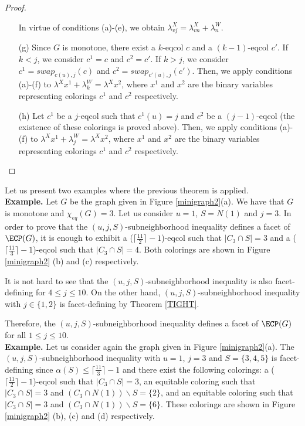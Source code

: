 \begin{proof}
\begin{enumerate}
In virtue of conditions (a)-(e), we obtain $\lambda^X_{vj} = \lambda^X_{vn} + \lambda^W_n$.
\item[(g)] Since $G$ is monotone, there exist a $k$-eqcol $c$ and a $(k-1)$-eqcol $c'$.
If $k < j$, we consider $c^1 = c$ and $c^2 = c'$. If $k > j$, we consider
$c^1 = swap_{c(u),j}(c)$ and $c^2 = swap_{c'(u),j}(c')$. Then, we apply conditions (a)-(f)
to $\lambda^X x^1 + \lambda^W_k = \lambda^X x^2$, where $x^1$ and $x^2$ are the binary variables representing
colorings $c^1$ and $c^2$ respectively.
\item[(h)] Let $c^1$ be a $j$-eqcol such that $c^1(u) = j$ and $c^2$ be a $(j-1)$-eqcol (the existence of these
colorings is proved above). Then, we apply conditions (a)-(f) to $\lambda^X x^1 + \lambda^W_j = \lambda^X x^2$,
where $x^1$ and $x^2$ are the binary variables representing colorings $c^1$ and $c^2$ respectively.
\end{enumerate}
\end{proof}

Let us present two examples where the previous theorem is applied.\\

\noindent \textbf{Example.} Let $G$ be the graph given in Figure \ref{minigraph2}(a). We have that $G$ is
monotone and $\chi_{eq}(G) = 3$. Let us consider $u = 1$, $S = N(1)$ and $j = 3$. In order to prove that the $(u,j,S)$-subneighborhood inequality
defines a facet of $\ECP(G)$, it is enough to exhibit a ($\lceil \frac{11}{2} \rceil - 1$)-eqcol
such that $|C_3 \cap S| = 3$ and a ($\lceil \frac{11}{3} \rceil - 1$)-eqcol such that $|C_3 \cap S| = 4$.
Both colorings are shown in Figure \ref{minigraph2} (b) and (c) respectively.

It is not hard to see that the $(u,j,S)$-subneighborhood inequality is also facet-defining for
$4 \leq j \leq 10$.
On the other hand, $(u,j,S)$-subneighborhood inequality with $j \in \{ 1,2 \}$
is facet-defining by Theorem \ref{TIGHT}.

Therefore, the $(u,j,S)$-subneighborhood inequality defines a facet of $\ECP(G)$ for all $1 \leq j \leq 10$.\\

\noindent \textbf{Example.} Let us consider again the graph given in Figure \ref{minigraph2}(a). The $(u,j,S)$-subneighborhood inequality with $u = 1$, $j = 3$ and $S = \{3,4,5\}$
is facet-defining since $\alpha(S) \leq \lceil \frac{11}{3} \rceil - 1$ and there exist the following colorings:
a ($\lceil \frac{11}{2} \rceil - 1$)-eqcol such that
$|C_3 \cap S| = 3$, an equitable coloring such that $|C_3 \cap S| = 3$ and $(C_3 \cap N(1)) \backslash S = \{ 2 \}$, and
an equitable coloring such that $|C_3 \cap S| = 3$ and $(C_3 \cap N(1)) \backslash S = \{ 6 \}$.
These colorings are shown in Figure \ref{minigraph2} (b), (c) and (d) respectively.

